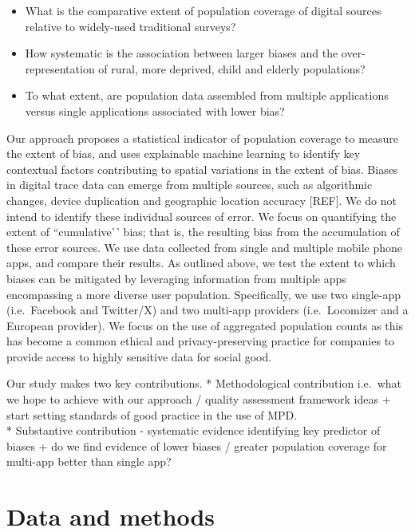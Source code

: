 \documentclass[]{rsos}%
\providecommand{\tightlist}{%
  \setlength{\itemsep}{0pt}\setlength{\parskip}{0pt}}
\begin{document}
\begin{itemize}
\tightlist
\item
  What is the comparative extent of population coverage of digital
  sources relative to widely-used traditional surveys?
\item
  How systematic is the association between larger biases and the
  over-representation of rural, more deprived, child and elderly
  populations?
\item
  To what extent, are population data assembled from multiple
  applications versus single applications associated with lower bias?
\end{itemize}

Our approach proposes a statistical indicator of population coverage to
measure the extent of bias, and uses explainable machine learning to
identify key contextual factors contributing to spatial variations in
the extent of bias. Biases in digital trace data can emerge from
multiple sources, such as algorithmic changes, device duplication and
geographic location accuracy {[}REF{]}. We do not intend to identify these
individual sources of error. We focus on quantifying the extent of
``cumulative'\,' bias; that is, the resulting bias from the accumulation
of these error sources. We use data collected from single and multiple
mobile phone apps, and compare their results. As outlined above, we test
the extent to which biases can be mitigated by leveraging information
from multiple apps encompassing a more diverse user population.
Specifically, we use two single-app (i.e.~Facebook and Twitter/X) and
two multi-app providers (i.e.~Locomizer and a European provider). We
focus on the use of aggregated population counts as this has become a
common ethical and privacy-preserving practice for companies to provide
access to highly sensitive data for social good.

Our study makes two key contributions. * Methodological contribution
i.e.~what we hope to achieve with our approach / quality assessment
framework ideas + start setting standards of good practice in the use of
MPD.\\
* Substantive contribution - systematic evidence identifying key
predictor of biases + do we find evidence of lower biases / greater
population coverage for multi-app better than single app?

\hypertarget{data-and-methods}{%
\section{Data and methods}\label{data-and-methods}}
\end{document}
